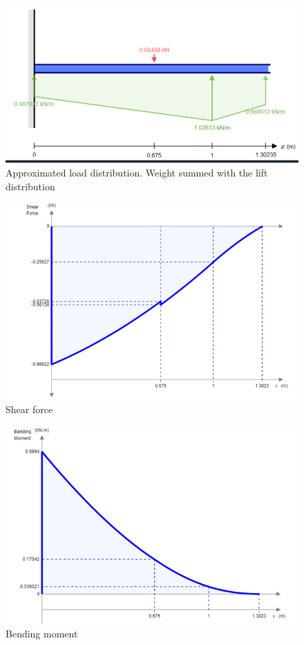\documentclass[english,fira]{ist-report}
\begin{document}
\begin{figure}[!ht]
    \centering
    \includegraphics[width = 0.9\linewidth]{graphics/Loads_distribution.png}
    \caption{Approximated load distribution. Weight summed with the lift distribution}
    \label{fig:loaddistribution}
\end{figure}

\begin{figure}[!ht]
    \centering
    \includegraphics[width = 0.9\linewidth]{graphics/Shear_force.png}
    \caption{Shear force}
    \label{fig:shear forces}
\end{figure}

\begin{figure}[!ht]
    \centering
    \includegraphics[width = 0.9\linewidth]{graphics/bending_moment_f.png}
    \caption{Bending moment}
    \label{fig:bending moment}
\end{figure}
\end{document}
